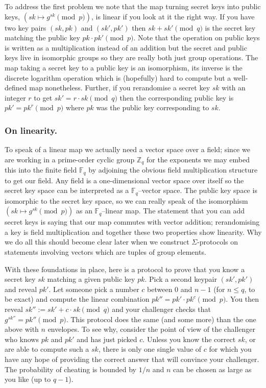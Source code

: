 \documentclass[envcountsame]{llncs}
\newenvironment{maths}{\begin{framed}
\vspace{-12pt}
\begin{figure}
\vspace{-12pt}\quad{\Huge $\sum$}
\end{figure}}{\end{framed}}
\begin{document}
To address the first problem we note that the map turning secret keys into
public keys, $(sk \mapsto g^{sk} \pmod{p})$, is linear if you look at it the
right way. If you have two key pairs $(sk, pk)$ and $(sk', pk')$ then $sk + sk'
\pmod{q}$ is the secret key matching the public key $pk \cdot pk' \pmod{p}$.
Note that the operation on public keys is written as a multiplication instead of
an addition but the secret and public keys live in isomorphic groups so they are
really both just group operations. The map taking a secret key to a public key
is an isomorphism, its inverse is the discrete logarithm operation which is
(hopefully) hard to compute but a well-defined map nonetheless. Further, if you
rerandomise a secret key $sk$ with an integer $r$ to get $sk' = r \cdot sk
\pmod{q}$ then the corresponding public key is $pk' = pk^r \pmod{p}$ where $pk$
was the public key corresponding to $sk$.

\begin{maths}
\subsubsection{On linearity.}
To speak of a linear map we actually need a vector space over a field; since we
are working in a prime-order cyclic group $\mathbb Z_q$ for the exponents we may
embed this into the finite field $\mathbb F_q$ by adjoining the obvious field
multiplication structure to get our field. Any field is a one-dimensional vector
space over itself so the secret key space can be interpreted as a $\mathbb
F_q$--vector space. The public key space is isomorphic to the secret key space,
so we can really speak of the isomorphism $(sk \mapsto g^{sk} \pmod{p})$ as an
$\mathbb F_q$--linear map. The statement that you can add secret keys is saying
that our map commutes with vector addition; rerandomising a key is field
multiplication and together these two properties show linearity. Why we do all
this should become clear later when we construct $\Sigma$-protocols on
statements involving vectors which are tuples of group elements.
\end{maths}

With these foundations in place, here is a protocol to prove that you know a
secret key $sk$ matching a given public key $pk$. Pick a second keypair $(sk',
pk')$ and reveal $pk'$. Let someone pick a number $c$ between $0$ and $n - 1$
(for $n \leq q$, to be exact) and compute the linear combination $pk'' = pk'
\cdot pk^c \pmod{p}$. You then reveal $sk'' := sk' + c \cdot sk \pmod{q}$ and
your challenger checks that $g^{sk''} = pk'' \pmod{p}$. This protocol does the
same (and some more) than the one above with $n$ envelopes. To see why, consider
the point of view of the challenger who knows $pk$ and $pk'$ and has just
picked $c$. Unless you know the correct $sk$, or are able to compute such a
$sk$, there is only one single value of $c$ for which you have any hope of
providing the correct answer that will convince your challenger. The
probability of cheating is bounded by $1/n$ and $n$ can be chosen as large as
you like (up to $q-1$).
\end{document}
